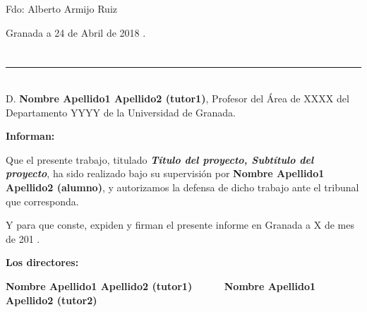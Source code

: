 \vspace{6cm}

\noindent Fdo: Alberto Armijo Ruiz

\vspace{2cm}

\begin{flushright}
Granada a 24 de Abril de 2018 .
\end{flushright}


\chapter*{}
\thispagestyle{empty}

\noindent\rule[-1ex]{\textwidth}{2pt}\\[4.5ex]

D. \textbf{Nombre Apellido1 Apellido2 (tutor1)}, Profesor del Área de XXXX del Departamento YYYY de la Universidad de Granada.

\vspace{0.5cm}

\textbf{Informan:}

\vspace{0.5cm}

Que el presente trabajo, titulado \textit{\textbf{Título del proyecto, Subtítulo del proyecto}},
ha sido realizado bajo su supervisión por \textbf{Nombre Apellido1 Apellido2 (alumno)}, y autorizamos la defensa de dicho trabajo ante el tribunal
que corresponda.

\vspace{0.5cm}

Y para que conste, expiden y firman el presente informe en Granada a X de mes de 201 .

\vspace{1cm}

\textbf{Los directores:}

\vspace{5cm}

\noindent \textbf{Nombre Apellido1 Apellido2 (tutor1) \ \ \ \ \ Nombre Apellido1 Apellido2 (tutor2)}


